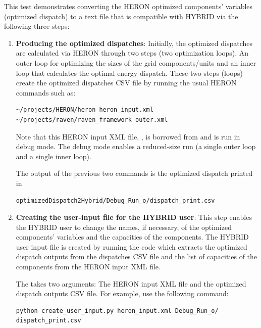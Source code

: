 This test demonstrates converting the HERON optimized components' variables (optimized dispatch) to a text file that is compatible with HYBRID via the following three steps:
\begin{enumerate}

\item \textbf{Producing the optimized dispatches}: Initially, the optimized dispatches are calculated via HERON through two steps (two optimization loops). An outer loop for optimizing the sizes of the grid components/units and an inner loop that calculates the optimal energy dispatch. These two steps (loops) create the optimized dispatches CSV file by running the usual HERON commands such as:
\begin{lstlisting}
~/projects/HERON/heron heron_input.xml
~/projects/raven/raven_framework outer.xml
\end{lstlisting}
Note that this HERON input XML file, , is borrowed from  and is run in debug mode. The debug mode enables a reduced-size run (a single outer loop and a single inner loop).

The output of the previous two commands is the optimized dispatch printed in
\begin{lstlisting}
optimizedDispatch2Hybrid/Debug_Run_o/dispatch_print.csv
\end{lstlisting}



\item \textbf{Creating the user-input file for the HYBRID user}: This step enables the HYBRID user to change the names, if necessary, of the optimized components' variables and the capacities of the components. The HYBRID user input file is created by running the code  which extracts the optimized dispatch outputs from the dispatches CSV file and the list of capacities of the components from the HERON input XML file.


The  takes two arguments: The HERON input XML file and the optimized dispatch outputs CSV file. For example, use the following command:
 \begin{lstlisting}
python create_user_input.py heron_input.xml Debug_Run_o/
dispatch_print.csv
  \end{lstlisting}




\end{enumerate}

